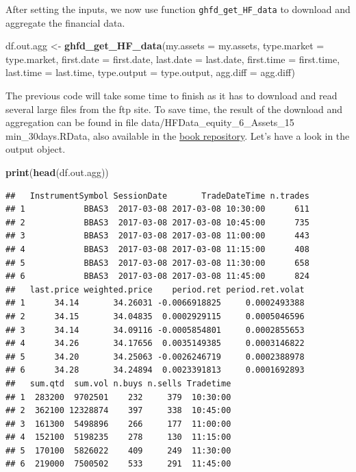 \documentclass[11pt,]{book}
\newenvironment{Shaded}{\begin{snugshade}}{\end{snugshade}}
\newcommand{\KeywordTok}[1]{\textcolor[rgb]{0.27,0.27,0.27}{\textbf{#1}}}
\newcommand{\DataTypeTok}[1]{\textcolor[rgb]{0.27,0.27,0.27}{#1}}
\newcommand{\StringTok}[1]{\textcolor[rgb]{0.5,0.5,0.5}{#1}}
\newcommand{\NormalTok}[1]{#1}
\begin{document}
After setting the inputs, we now use function
\texttt{ghfd\_get\_HF\_data} to download and aggregate the financial
data.

\begin{Shaded}
\begin{Highlighting}[]
\NormalTok{df.out.agg <-}\StringTok{ }\KeywordTok{ghfd_get_HF_data}\NormalTok{(}\DataTypeTok{my.assets =}\NormalTok{ my.assets,}
                               \DataTypeTok{type.market =}\NormalTok{ type.market,}
                               \DataTypeTok{first.date =}\NormalTok{ first.date,}
                               \DataTypeTok{last.date =}\NormalTok{ last.date,}
                               \DataTypeTok{first.time =}\NormalTok{ first.time,}
                               \DataTypeTok{last.time =}\NormalTok{ last.time,}
                               \DataTypeTok{type.output =}\NormalTok{ type.output,}
                               \DataTypeTok{agg.diff =}\NormalTok{ agg.diff)}
\end{Highlighting}
\end{Shaded}

The previous code will take some time to finish as it has to download
and read several large files from the ftp site. To save time, the result
of the download and aggregation can be found in file
data/HFData\_equity\_6\_Assets\_15 min\_30days.RData, also available in
the \href{https://github.com/msperlin/pmfdR-en-code_data}{book
repository}. Let's have a look in the output object.

\begin{Shaded}
\begin{Highlighting}[]
\KeywordTok{print}\NormalTok{(}\KeywordTok{head}\NormalTok{(df.out.agg))}
\end{Highlighting}
\end{Shaded}

\begin{verbatim}
##   InstrumentSymbol SessionDate       TradeDateTime n.trades
## 1            BBAS3  2017-03-08 2017-03-08 10:30:00      611
## 2            BBAS3  2017-03-08 2017-03-08 10:45:00      735
## 3            BBAS3  2017-03-08 2017-03-08 11:00:00      443
## 4            BBAS3  2017-03-08 2017-03-08 11:15:00      408
## 5            BBAS3  2017-03-08 2017-03-08 11:30:00      658
## 6            BBAS3  2017-03-08 2017-03-08 11:45:00      824
##   last.price weighted.price    period.ret period.ret.volat
## 1      34.14       34.26031 -0.0066918825     0.0002493388
## 2      34.15       34.04835  0.0002929115     0.0005046596
## 3      34.14       34.09116 -0.0005854801     0.0002855653
## 4      34.26       34.17656  0.0035149385     0.0003146822
## 5      34.20       34.25063 -0.0026246719     0.0002388978
## 6      34.28       34.24894  0.0023391813     0.0001692893
##   sum.qtd  sum.vol n.buys n.sells Tradetime
## 1  283200  9702501    232     379  10:30:00
## 2  362100 12328874    397     338  10:45:00
## 3  161300  5498896    266     177  11:00:00
## 4  152100  5198235    278     130  11:15:00
## 5  170100  5826022    409     249  11:30:00
## 6  219000  7500502    533     291  11:45:00
\end{verbatim}
\end{document}
